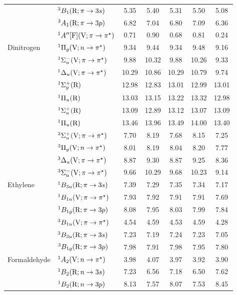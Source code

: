 \begin{tabular}{p{3.5cm}p{3.3cm}c|cccc}
        &$^3B_1 (\mathrm{R};\pi \rightarrow 3s)$ 				&5.35	&5.40	&5.31	&5.50	&5.08	\\
        &$^3A_1 (\mathrm{R};\pi \rightarrow 3p)$				&6.82	&7.04	&6.80	&7.09	&6.36	\\
        &$^1A^{\prime\prime} [\mathrm{F}]	(\mathrm{V};\pi \rightarrow \pi^\star)$			&0.71	&0.90	&0.68	&0.81	&0.24	\\
  Dinitrogen		&$^1\Pi_g (\mathrm{V};n \rightarrow \pi^\star)$ 				&9.34	&9.44	&9.34	&9.48	&9.16	\\
        &$^1\Sigma_u^- (\mathrm{V};\pi \rightarrow \pi^\star)$			&9.88	&10.32	&9.88	&10.26	&9.33	\\
        &$^1\Delta_u (\mathrm{V};\pi \rightarrow \pi^\star)$ 				&10.29	&10.86	&10.29	&10.79	&9.74	\\
        &$^1\Sigma_g^+ (\mathrm{R})$ 					&12.98	&12.83	&13.01	&12.99	&13.01	\\
        &$^1\Pi_u (\mathrm{R})$ 						&13.03	&13.15	&13.22	&13.32	&12.98	\\
        &$^1\Sigma_u^+ (\mathrm{R})$ 					&13.09	&12.89	&13.12	&13.07	&13.09	\\
        &$^1\Pi_u (\mathrm{R})$ 						&13.46	&13.96	&13.49	&14.00	&13.40	\\
        &$^3\Sigma_u^+ (\mathrm{V};\pi \rightarrow \pi^\star)$			&7.70	&8.19	&7.68	&8.15	&7.25	\\
        &$^3\Pi_g (\mathrm{V};n \rightarrow \pi^\star)$ 				&8.01	&8.19	&8.04	&8.20	&7.77	\\
        &$^3\Delta_u (\mathrm{V};\pi \rightarrow \pi^\star)$ 				&8.87	&9.30	&8.87	&9.25	&8.36	\\
        &$^3\Sigma_u^- (\mathrm{V};\pi \rightarrow \pi^\star)$			&9.66	&10.29	&9.68	&10.23	&9.14	\\
  Ethylene		&$^1B_{3u} (\mathrm{R};\pi \rightarrow 3s)$ 				&7.39	&7.29	&7.35	&7.34	&7.17 	\\
        &$^1B_{1u} (\mathrm{V};\pi \rightarrow \pi^\star)$ 				&7.93	&7.92	&7.91	&7.91	&7.69 	\\
        &$^1B_{1g} (\mathrm{R};\pi \rightarrow 3p)$ 				&8.08	&7.95	&8.03	&7.99	&7.84	\\
        &$^3B_{1u} (\mathrm{V};\pi \rightarrow \pi^\star)$ 				&4.54	&4.59	&4.53	&4.59	&4.28 	\\
        &$^3B_{3u} (\mathrm{R};\pi \rightarrow 3s)$ 				&7.23	&7.19	&7.24	&7.23	&7.05	\\
        &$^3B_{1g} (\mathrm{R};\pi \rightarrow 3p)$ 				&7.98	&7.91	&7.98	&7.95	&7.80	\\
  Formaldehyde	&$^1A_2 (\mathrm{V}; n \rightarrow \pi^\star)$ 				&3.98	&4.07	&3.97	&3.92	&3.90 	\\
        &$^1B_2 (\mathrm{R};n \rightarrow 3s)$ 					&7.23	&6.56	&7.18	&6.50	&7.62 	\\
        &$^1B_2 (\mathrm{R};n \rightarrow 3p)$ 					&8.13	&7.57	&8.07	&7.53	&8.45	\\

\end{tabular}
